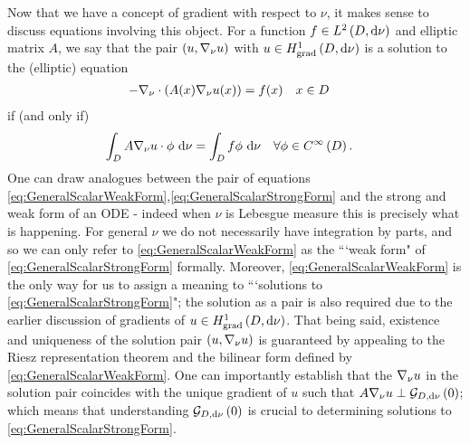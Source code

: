 Now that we have a concept of gradient with respect to $\nu$, it makes sense to discuss equations involving this object.
For a function $f\in L^{2}\left( D,\mathrm{d}\nu \right)$ and elliptic matrix $A$, we say that the pair $\left( u,\nabla_\nu u \right)$ with $u\in H^1_\mathrm{grad}\left( D, \mathrm{d}\nu \right)$ is a solution to the (elliptic) equation
\begin{align} \label{eq:GeneralScalarStrongForm}
	-\nabla_\nu \cdot \left( A(x)\nabla_\nu u(x) \right) &= f(x) \quad x\in D
\end{align}
if (and only if)
\begin{align} \label{eq:GeneralScalarWeakForm}
	\int_{D}A\nabla_\nu u \cdot \phi \ \mathrm{d}\nu &= \int_{D}f\phi \ \mathrm{d}\nu \quad \forall \phi\in C^{\infty}\left( D \right).
\end{align}
One can draw analogues between the pair of equations \eqref{eq:GeneralScalarWeakForm},\eqref{eq:GeneralScalarStrongForm} and the strong and weak form of an ODE - indeed when $\nu$ is Lebesgue measure this is precisely what is happening.
For general $\nu$ we do not necessarily have integration by parts, and so we can only refer to \eqref{eq:GeneralScalarWeakForm} as the ```weak form" of \eqref{eq:GeneralScalarStrongForm} formally.
Moreover, \eqref{eq:GeneralScalarWeakForm} is the only way for us to assign a meaning to ```solutions to \eqref{eq:GeneralScalarStrongForm}"; the solution as a pair is also required due to the earlier discussion of gradients of $u\in H^1_\mathrm{grad}\left( D, \mathrm{d}\nu \right)$.
That being said, existence and uniqueness of the solution pair $\left( u,\nabla_\nu u \right)$ is guaranteed by appealing to the Riesz representation theorem and the bilinear form defined by \eqref{eq:GeneralScalarWeakForm}.
One can  importantly establish that the $\nabla_\nu u$ in the solution pair coincides with the unique gradient of $u$ such that $A\nabla_\nu u \perp \mathcal{G}_{ D, \mathrm{d}\nu}\left( 0 \right)$; which means that understanding $\mathcal{G}_{ D, \mathrm{d}\nu}\left( 0 \right)$ is crucial to determining solutions to \eqref{eq:GeneralScalarStrongForm}.

